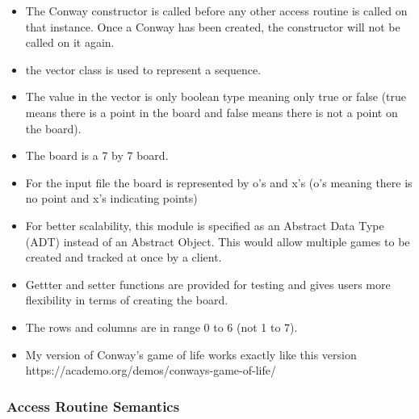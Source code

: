 \documentclass[12pt]{article}
\begin{document}
\begin{itemize}

\item The Conway constructor is called before any other access
  routine is called on that instance. Once a Conway has been created, the
  constructor will not be called on it again.

\item the vector class is used to represent a sequence.

\item The value in the vector is only boolean type meaning only true or false (true means there is a point in the board and false means there is not a point on the board).

\item The board is a 7 by 7 board.

\item For the input file the board is represented by o's and x's (o's meaning there is no point and x's indicating points)

\item For better scalability, this module is specified as an Abstract Data Type
  (ADT) instead of an Abstract Object. This would allow multiple games to be
  created and tracked at once by a client.

\item Gettter and setter functions are provided for testing and gives users more flexibility in terms of creating the board.

\item The rows and columns are in range 0 to 6 (not 1 to 7).

\item My version of Conway's game of life works exactly like this version https://academo.org/demos/conways-game-of-life/


\end{itemize}

\newpage

\subsubsection* {Access Routine Semantics}
\end{document}
